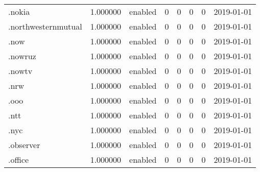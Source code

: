 \begin{tabular}{lrlrrrrl}
.nokia                    &          1.000000 &         enabled &                           0 &                           0 &                           0 &                   0 &           2019-01-01 \\
.northwesternmutual       &          1.000000 &         enabled &                           0 &                           0 &                           0 &                   0 &           2019-01-01 \\
.now                      &          1.000000 &         enabled &                           0 &                           0 &                           0 &                   0 &           2019-01-01 \\
.nowruz                   &          1.000000 &         enabled &                           0 &                           0 &                           0 &                   0 &           2019-01-01 \\
.nowtv                    &          1.000000 &         enabled &                           0 &                           0 &                           0 &                   0 &           2019-01-01 \\
.nrw                      &          1.000000 &         enabled &                           0 &                           0 &                           0 &                   0 &           2019-01-01 \\
.ooo                      &          1.000000 &         enabled &                           0 &                           0 &                           0 &                   0 &           2019-01-01 \\
.ntt                      &          1.000000 &         enabled &                           0 &                           0 &                           0 &                   0 &           2019-01-01 \\
.nyc                      &          1.000000 &         enabled &                           0 &                           0 &                           0 &                   0 &           2019-01-01 \\
.observer                 &          1.000000 &         enabled &                           0 &                           0 &                           0 &                   0 &           2019-01-01 \\
.office                   &          1.000000 &         enabled &                           0 &                           0 &                           0 &                   0 &           2019-01-01 \\

\end{tabular}
